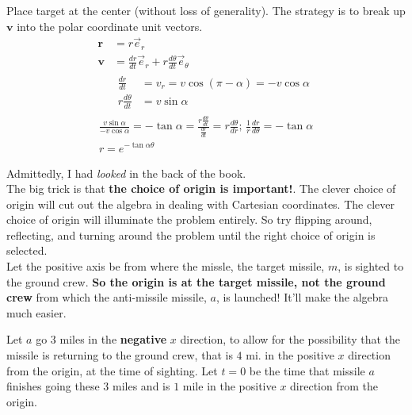 \documentclass[twoside]{amsart}
\theoremstyle{plain}
\theoremstyle{definition}
\newcommand{\exercisehead}[1]
  {\smallskip
   \noindent{\small\bf Exercise #1.}}
\begin{document}
\exercisehead{15}
Place target at the center (without loss of generality).  The strategy is to break up $\mathbf{v}$ into the polar coordinate unit vectors.  
\[
\begin{aligned}
  \mathbf{r} & = r \vec{e}_r \\
  \mathbf{v} & = \frac{ dr}{ dt} \vec{e}_r + r \frac{ d\theta}{dt} \vec{e}_{\theta} \\
  & \begin{aligned}
    \frac{dr}{dt} & = v_r = v \cos{ (\pi - \alpha)} = -v \cos{ \alpha} \\
    r \frac{d\theta}{dt} & = v \sin{\alpha} 
    \end{aligned}
\end{aligned}
\]
\[
\begin{gathered}
  \frac{ v\sin{\alpha}}{ - v \cos{\alpha}} = - \tan{\alpha} = \frac{ r \frac{d\theta}{dt} }{ \frac{dr}{dt} } = r \frac{d\theta}{dr} ; \, \frac{1}{r} \frac{ dr}{d\theta} = -\tan{\alpha} \\
  r = e^{ -\tan{\alpha} \theta }
\end{gathered}
\]

\exercisehead{16} Admittedly, I had {\large \emph{ looked }} in the {\large back of the book}.  \\

The {\LARGE big trick} is that {\Large \textbf{ the choice of origin is important!}}.  The clever choice of origin will cut out the algebra in dealing with Cartesian coordinates.  The clever choice of origin will illuminate the problem entirely.  So try flipping around, reflecting, and turning around the problem until the right choice of origin is selected.  \\

Let the positive axis be from where the missle, the target missile, $m$, is sighted to the ground crew.  \textbf{So the origin is at the target missile, not the ground crew} from which the anti-missile missile, $a$, is launched!  It'll make the algebra much easier.  

Let $a$ go $3$ miles in the \textbf{negative} $x$ direction, to allow for the possibility that the missile is returning to the ground crew, that is $4$ mi. in the positive $x$ direction from the origin, at the time of sighting.  Let $t=0$ be the time that missile $a$ finishes going these $3$ miles and is $1$ mile in the positive $x$ direction from the origin.  
\end{document}
